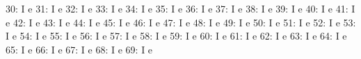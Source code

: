 \documentclass[nojss]{jss}
\begin{document}
\begin{Schunk}
\begin{Soutput}
 30:                                   I                        e
 31:                                   I                        e
 32:                                   I                        e
 33:                                   I                        e
 34:                                   I                        e
 35:                                   I                        e
 36:                                   I                        e
 37:                                   I                        e
 38:                                   I                        e
 39:                                   I                        e
 40:                                   I                        e
 41:                                   I                        e
 42:                                   I                        e
 43:                                   I                        e
 44:                                   I                        e
 45:                                   I                        e
 46:                                   I                        e
 47:                                   I                        e
 48:                                   I                        e
 49:                                   I                        e
 50:                                   I                        e
 51:                                   I                        e
 52:                                   I                        e
 53:                                   I                        e
 54:                                   I                        e
 55:                                   I                        e
 56:                                   I                        e
 57:                                   I                        e
 58:                                   I                        e
 59:                                   I                        e
 60:                                   I                        e
 61:                                   I                        e
 62:                                   I                        e
 63:                                   I                        e
 64:                                   I                        e
 65:                                   I                        e
 66:                                   I                        e
 67:                                   I                        e
 68:                                   I                        e
 69:                                   I                        e

\end{Soutput}
\end{Schunk}
\end{document}
